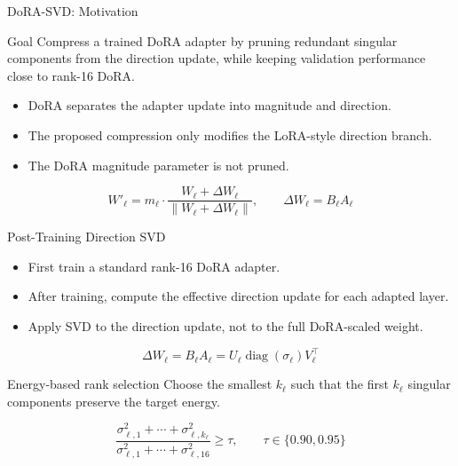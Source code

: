 \begin{frame}{DoRA-SVD: Motivation}
\begin{block}{Goal}
Compress a trained DoRA adapter by pruning redundant singular components from the direction update, while keeping validation performance close to rank-16 DoRA.
\end{block}

\vspace{6pt}
\begin{itemize}
  \item DoRA separates the adapter update into magnitude and direction.
  \item The proposed compression only modifies the LoRA-style direction branch.
  \item The DoRA magnitude parameter is not pruned.
\end{itemize}

\[
W'_\ell
=
m_\ell
\cdot
\frac{W_\ell+\Delta W_\ell}
{\|W_\ell+\Delta W_\ell\|},
\qquad
\Delta W_\ell = B_\ell A_\ell
\]
\end{frame}

\begin{frame}{Post-Training Direction SVD}
\begin{itemize}
  \item First train a standard rank-16 DoRA adapter.
  \item After training, compute the effective direction update for each adapted layer.
  \item Apply SVD to the direction update, not to the full DoRA-scaled weight.
\end{itemize}

\[
\Delta W_\ell
=
B_\ell A_\ell
=
U_\ell \operatorname{diag}(\sigma_\ell)V_\ell^\top
\]

\vspace{4pt}
\begin{block}{Energy-based rank selection}
Choose the smallest \(k_\ell\) such that the first \(k_\ell\) singular components preserve the target energy.
\end{block}

\[
\frac{\sigma_{\ell,1}^2+\cdots+\sigma_{\ell,k_\ell}^2}
     {\sigma_{\ell,1}^2+\cdots+\sigma_{\ell,16}^2}
\ge
\tau,
\qquad
\tau\in\{0.90,0.95\}
\]
\end{frame}

